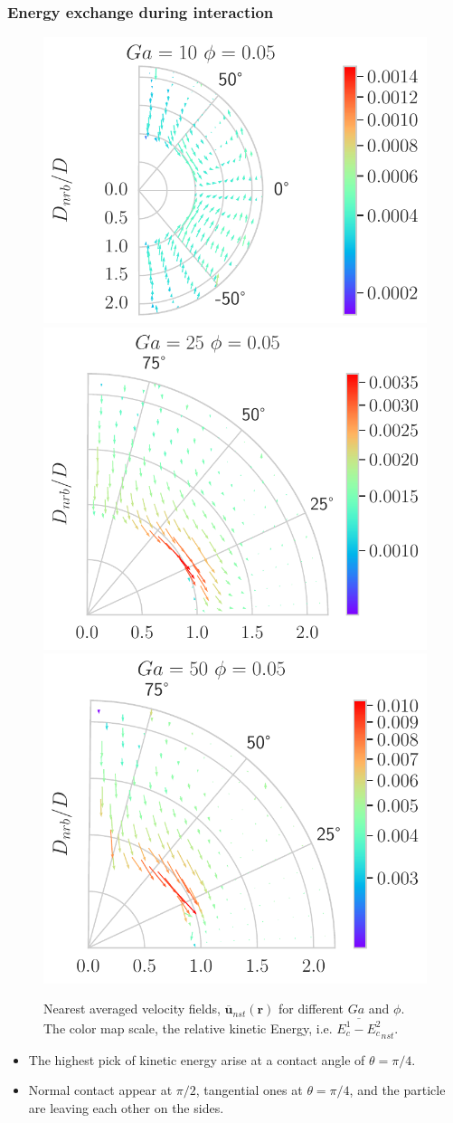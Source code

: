 \documentclass{sintefbeamer}
\newcommand{\nstavg}[1]{\overline{#1}_{nst}}
\begin{document}
\begin{frame}
  \frametitle{Energy exchange during interaction}

  \begin{figure}
    \includegraphics[height=0.2\textwidth]{image/Dim_3/fDrop/Dmin_Theta_Ec_Ga_10_PHI_0_05.pdf}
    \includegraphics[height=0.2\textwidth]{image/Dim_3/fDrop/Dmin_Theta_Ec_Ga_25_PHI_0_05.pdf}
    \includegraphics[height=0.2\textwidth]{image/Dim_3/fDrop/Dmin_Theta_Ec_Ga_50_PHI_0_05.pdf}

    
    \caption{Nearest averaged velocity fields, $\nstavg{\textbf{u}}(\textbf{r})$ for different $Ga$ and $\phi$. 
    The color map scale, the relative kinetic Energy, i.e.  $\nstavg{E_c^1 - E_c^2}$.}
  \end{figure}

\begin{itemize}
  \item The highest pick of kinetic energy arise at a contact angle of $\theta = \pi /4$. 
  \item Normal contact appear at $\pi/2$, tangential ones at  $\theta = \pi /4$, and the particle are leaving each other on the sides. 
\end{itemize}
\end{frame}
\end{document}
